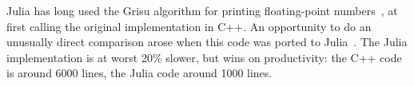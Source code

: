 Julia has long used the Grisu algorithm for printing floating-point
numbers~\cite{Loitsch:2010:PFN:1809028.1806623}, at first calling the
original implementation in C++.
An opportunity to do an unusually direct comparison arose when this
code was ported to Julia~\cite{grisu}.
The Julia implementation is at worst 20\% slower, but wins on
productivity: the C++ code is around 6000 lines, the Julia code
around 1000 lines.
